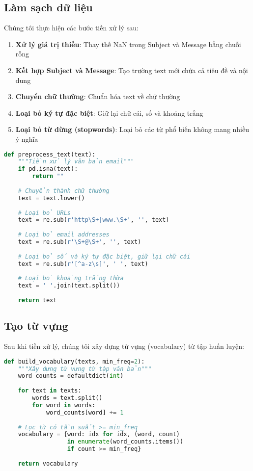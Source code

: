 \subsection{Làm sạch dữ liệu}
Chúng tôi thực hiện các bước tiền xử lý sau:

\begin{enumerate}
    \item \textbf{Xử lý giá trị thiếu}: Thay thế NaN trong Subject và Message bằng chuỗi rỗng
    \item \textbf{Kết hợp Subject và Message}: Tạo trường text mới chứa cả tiêu đề và nội dung
    \item \textbf{Chuyển chữ thường}: Chuẩn hóa text về chữ thường
    \item \textbf{Loại bỏ ký tự đặc biệt}: Giữ lại chữ cái, số và khoảng trắng
    \item \textbf{Loại bỏ từ dừng (stopwords)}: Loại bỏ các từ phổ biến không mang nhiều ý nghĩa
\end{enumerate}

\begin{lstlisting}[language=Python]
def preprocess_text(text):
    """Tiền xử lý văn bản email"""
    if pd.isna(text):
        return ""
    
    # Chuyển thành chữ thường
    text = text.lower()
    
    # Loại bỏ URLs
    text = re.sub(r'http\S+|www.\S+', '', text)
    
    # Loại bỏ email addresses
    text = re.sub(r'\S+@\S+', '', text)
    
    # Loại bỏ số và ký tự đặc biệt, giữ lại chữ cái
    text = re.sub(r'[^a-z\s]', ' ', text)
    
    # Loại bỏ khoảng trắng thừa
    text = ' '.join(text.split())
    
    return text
\end{lstlisting}

\subsection{Tạo từ vựng}
Sau khi tiền xử lý, chúng tôi xây dựng từ vựng (vocabulary) từ tập huấn luyện:

\begin{lstlisting}[language=Python]
def build_vocabulary(texts, min_freq=2):
    """Xây dựng từ vựng từ tập văn bản"""
    word_counts = defaultdict(int)
    
    for text in texts:
        words = text.split()
        for word in words:
            word_counts[word] += 1
    
    # Lọc từ có tần suất >= min_freq
    vocabulary = {word: idx for idx, (word, count) 
                  in enumerate(word_counts.items()) 
                  if count >= min_freq}
    
    return vocabulary
\end{lstlisting}

